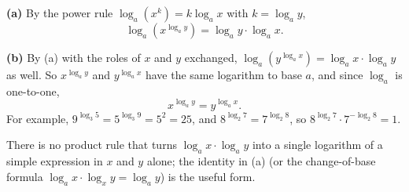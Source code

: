 \textbf{(a)} By the power rule $\log_a(x^k)=k\log_a x$ with $k=\log_a y$,
\[
\log_a\!\left(x^{\log_a y}\right)=\log_a y\cdot\log_a x .
\]

\textbf{(b)} By (a) with the roles of $x$ and $y$ exchanged, $\log_a\!\left(y^{\log_a x}\right)=\log_a x\cdot\log_a y$ as well. So $x^{\log_a y}$ and $y^{\log_a x}$ have the same logarithm to base $a$, and since $\log_a$ is one-to-one,
\[
x^{\log_a y}=y^{\log_a x}.
\]
For example, $9^{\log_3 5}=5^{\log_3 9}=5^2=\boxed{25}$, and $8^{\log_2 7}=7^{\log_2 8}$, so $8^{\log_2 7}\cdot7^{-\log_2 8}=\boxed{1}$.

There is no product rule that turns $\log_a x\cdot\log_a y$ into a single logarithm of a simple expression in $x$ and $y$ alone; the identity in (a) (or the change-of-base formula $\log_a x\cdot\log_x y=\log_a y$) is the useful form.
